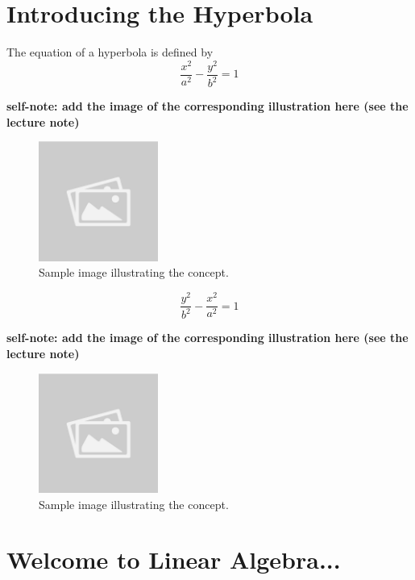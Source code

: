 \documentclass{article}
\begin{document}
\section*{Introducing the Hyperbola}
\begin{definitionbox}
The equation of a hyperbola is defined by
\[
    \dfrac{x^2}{a^2} - \dfrac{y^2}{b^2} = 1
\]
\begin{illustrationbox}
    \textbf{self-note: add the image of the corresponding illustration here (see the lecture note)}
    \begin{figure}[H]
        \centering
        \includegraphics[width=0.35\textwidth]{sample_image.jpg}
        \caption{Sample image illustrating the concept.}
        \label{fig:sample_image}
    \end{figure}
\end{illustrationbox}
\[
    \dfrac{y^2}{b^2} - \dfrac{x^2}{a^2} = 1
\]
\begin{illustrationbox}
    \textbf{self-note: add the image of the corresponding illustration here (see the lecture note)}
    \begin{figure}[H]
        \centering
        \includegraphics[width=0.35\textwidth]{sample_image.jpg}
        \caption{Sample image illustrating the concept.}
        \label{fig:sample_image}
    \end{figure}
\end{illustrationbox}
\end{definitionbox}

\section*{Welcome to Linear Algebra...}
\end{document}
